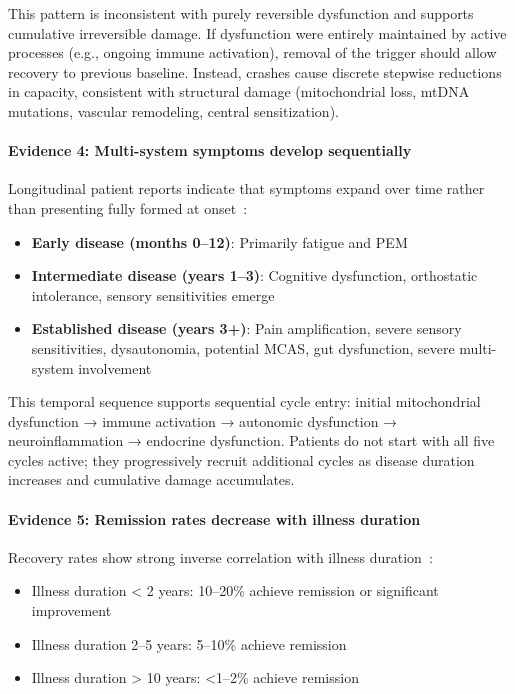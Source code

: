 This pattern is inconsistent with purely reversible dysfunction and supports cumulative irreversible damage. If dysfunction were entirely maintained by active processes (e.g., ongoing immune activation), removal of the trigger should allow recovery to previous baseline. Instead, crashes cause discrete stepwise reductions in capacity, consistent with structural damage (mitochondrial loss, mtDNA mutations, vascular remodeling, central sensitization).

\paragraph{Evidence 4: Multi-system symptoms develop sequentially}

Longitudinal patient reports indicate that symptoms expand over time rather than presenting fully formed at onset~\cite{Maksoud2020natural}:
\begin{itemize}
    \item \textbf{Early disease (months 0--12)}: Primarily fatigue and PEM
    \item \textbf{Intermediate disease (years 1--3)}: Cognitive dysfunction, orthostatic intolerance, sensory sensitivities emerge
    \item \textbf{Established disease (years 3+)}: Pain amplification, severe sensory sensitivities, dysautonomia, potential MCAS, gut dysfunction, severe multi-system involvement
\end{itemize}

This temporal sequence supports sequential cycle entry: initial mitochondrial dysfunction → immune activation → autonomic dysfunction → neuroinflammation → endocrine dysfunction. Patients do not start with all five cycles active; they progressively recruit additional cycles as disease duration increases and cumulative damage accumulates.

\paragraph{Evidence 5: Remission rates decrease with illness duration}

Recovery rates show strong inverse correlation with illness duration~\cite{Lacourt2022prognosis}:
\begin{itemize}
    \item Illness duration < 2 years: 10--20\% achieve remission or significant improvement
    \item Illness duration 2--5 years: 5--10\% achieve remission
    \item Illness duration > 10 years: <1--2\% achieve remission
\end{itemize}

